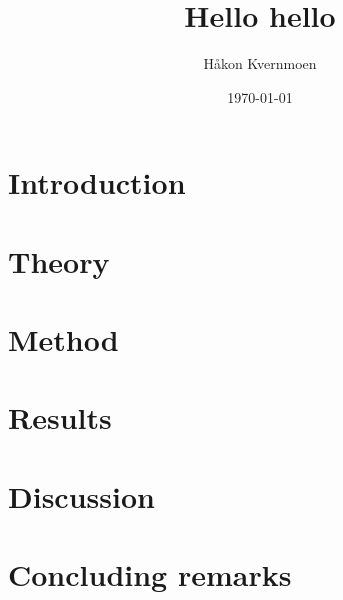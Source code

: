 \documentclass[twocolumn,english,notitlepage]{article}
\title{Hello hello}
\author{Håkon Kvernmoen}
\date{\today}
\begin{document}



\section{Introduction}


\section{Theory}


\section{Method}


\section{Results}


\section{Discussion}


\section{Concluding remarks} 



\renewcommand{\theequation}{\thesection.\arabic{equation}}
\newpage
\begin{appendices}
     
\end{appendices}

\newpage

\end{document}
